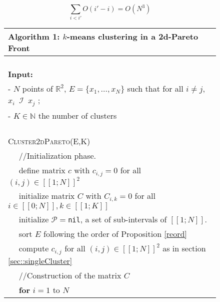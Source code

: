 \documentclass{meta}
\def\NN{{\mathbb{N}}}
\def\RR{{\mathbb{R}}}
\def\PP{{\mathcal{P}}}
\begin{document}
$$\sum_{i<i'} O(i'-i) = O(N^3)$$








\begin{figure}[ht]
 \centering 
\begin{tabular}{ l }
\hline
\textbf{Algorithm 1: $k$-means clustering in a 2d-Pareto Front}\\
\hline
\verb!  !\\

\textbf{Input:} \\
- $N$ points  of $\RR^2$, $E =\{x_1,\dots, x_N\}$  %
such that for all $ i\neq j$, $x_i \phantom{0} \mathcal{I} \phantom{0} x_j$ ;\\
- $K\in\NN$ the number of clusters\\

\verb!  !\\

\textsc{Cluster2dPareto}(E,K)\\
\verb!  ! //Initialization phase. \\ %
\verb!  ! define matrix $c$ with $c_{i,j}=0$  for all $(i,j)\in [\![1;N]\!]^2$\\
\verb!  ! initialize  matrix $C$ with  $C_{i,k}=0$  for all $i\in [\![0;N]\!], k\in [\![1;K]\!]$\\
\verb!  ! initialize $\PP=$\verb!nil!, a set of sub-intervals of $[\![1;N]\!]$.\\
\verb!  ! sort $E$ following the order of Proposition \ref{reord}\\
\verb!  ! compute $c_{i,j}$ for all $(i,j)\in [\![1;N]\!]^2$ as in section \ref{sec::singleCluster}\\
\verb!  ! //Construction of the matrix $C$ \\
\verb!  ! \textbf{for} $i=1$ to $N$\\


\end{tabular}
\end{figure}
\end{document}
